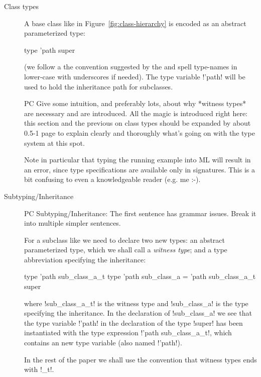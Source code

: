 \documentclass[workingdraft]{usetex-v1}
\begin{document}
\begin{description}
\item[Class types] A base class like  in
  Figure~\ref{fig:class-hierarchy} is encoded as an abstract
  parameterized type:
\begin{SMLcode}
type 'path super
\end{SMLcode}
(we follow a the convention suggested by the \smlbasis and spell
type-names in lower-case with underscores if needed).  The type
variable !'path! will be used to hold the inheritance path for
subclasses.

\begin{ednote}{PC}
    Give some intuition, and preferably lots, about why *witness
  types* are necessary and are introduced.  All the magic is
  introduced right here: this section and the previous on
  class types should be expanded by about 0.5-1 page to
  explain clearly and thoroughly what's going on with the type
  system at this spot.  

  Note in particular that typing the
  running example into ML will result in an error, since type
  specifications are available only in signatures.  This is
  a bit confusing to even a knowledgeable reader (e.g. me :-).
\end{ednote}

\item[Subtyping/Inheritance] 

  \begin{ednote}{PC}
      Subtyping/Inheritance: The first sentence has grammar
  issues.  Break it into multiple simpler sentences.

  \end{ednote}

For a subclass like 
  we need to declare two new \sml types: an abstract parameterized
  type, which we shall call a \emph{witness type}; and a type
  abbreviation specifying the inheritance:
\begin{SMLcode}
type 'path sub_class_a_t
type 'path sub_class_a = 
        'path sub_class_a_t super
\end{SMLcode}
where !sub_class_a_t! is the witness type and !sub_class_a! is the
type specifying the inheritance.  In the declaration of !sub_class_a!
we see that the type variable !'path! in the declaration of the type
!super! has been instantiated with the type expression 
!'path sub_class_a_t!, which contains an new type variable (also named
!'path!).

In the rest of the paper we shall use the convention that witness
types ends with !_t!.


\end{description}
\end{document}
